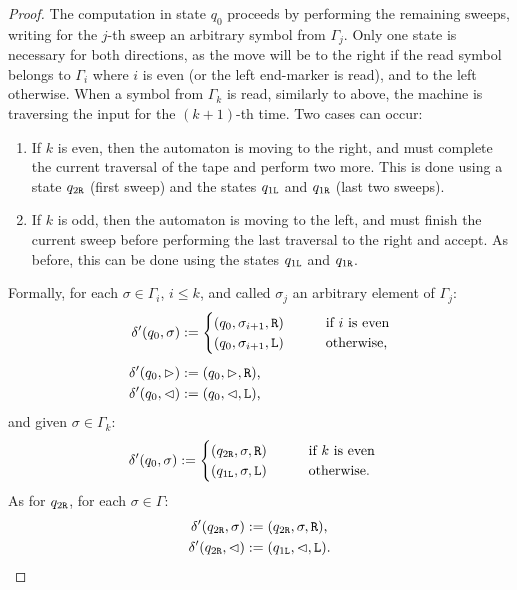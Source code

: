 \begin{proof}
	The computation in state $q_0$ proceeds by performing the remaining sweeps, writing for the $j$-th sweep an arbitrary symbol from $\Gamma_j$.
	Only one state is necessary for both directions, as the move will be to the right if the read symbol belongs to $\Gamma_i$ where $i$ is even (or the left end-marker is read), and to the left otherwise.
	When a symbol from $\Gamma_k$ is read, similarly to above, the machine is traversing the input for the $(k+1)$-th time. Two cases can occur:
	\begin{enumerate}
		\item If $k$ is even, then the automaton is moving to the right, and must complete the current traversal of the tape and perform two more. This is done using a state $q_{2\mathtt{R}}$ (first sweep) and the states $q_{1\mathtt{L}}$ and $q_{1\mathtt{R}}$ (last two sweeps).
		\item If $k$ is odd, then the automaton is moving to the left, and must finish the current sweep before performing the last traversal to the right and accept. As before, this can be done using the states $q_{1\mathtt{L}}$ and $q_{1\mathtt{R}}$.
	\end{enumerate}

	Formally, for each $\sigma\in\Gamma_i$, $i\le k$, and called $\sigma_j$ an arbitrary element of $\Gamma_j$:
	\begin{align*}
		\delta'(q_0,\sigma) & := \begin{cases}
			                         (q_0,\sigma_{i+1},\mathtt R) \qquad & \text{if $i$ is even}   \\
			                         (q_0,\sigma_{i+1},\mathtt L) \qquad & \text{otherwise} \text,
		                         \end{cases} \\[1ex]
		\delta'(q_0,\rhd)   & := (q_0,\rhd,\mathtt R) \text,                                   \\
		\delta'(q_0,\lhd)   & := (q_0,\lhd,\mathtt L) \text,
	\end{align*}
	and given $\sigma\in\Gamma_k$:
	\begin{align*}
		\delta'(q_0,\sigma) & := \begin{cases}
			                         (q_{2\mathtt{R}},\sigma,\mathtt R) \qquad & \text{if $k$ is even}   \\
			                         (q_{1\mathtt{L}},\sigma,\mathtt L) \qquad  & \text{otherwise} \text.
		                         \end{cases}
	\end{align*}
	As for $q_{2\mathtt{R}}$, for each $\sigma\in\Gamma$:
	\begin{align*}
		\delta'(q_{2\mathtt{R}},\sigma) & :=(q_{2\mathtt{R}},\sigma,\mathtt R) \text,       \\
		\delta'(q_{2\mathtt{R}},\lhd)   & :=(q_{1\mathtt{L}},\lhd,\mathtt L) \text. \qedhere
	\end{align*}
\end{proof}

